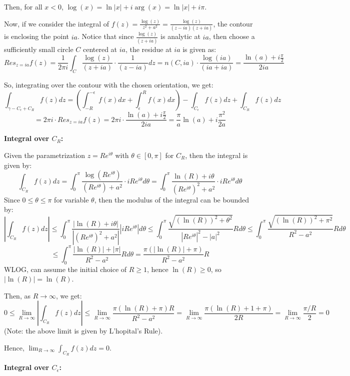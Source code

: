 \documentclass{article}
\begin{document}
Then, for all $x<0$, $\log(x)=\ln|x|+i\arg(x)=\ln|x|+i\pi$.

\hfil

Now, if we consider the integral of $f(z)=\frac{\log(z)}{z^2+a^2}=\frac{\log(z)}{(z-ia)(z+ia)}$, the contour is enclosing the point $ia$. 
Notice that since $\frac{\log(z)}{(z+ia)}$ is analytic at $ia$, then choose a sufficiently small circle $C$ centered at $ia$, the residue at $ia$ is given as:
$$Res_{z=ia}f(z) = \frac{1}{2\pi i}\int_{C}\frac{\log(z)}{(z+ia)}\cdot\frac{1}{(z-ia)}dz = n(C,ia)\cdot \frac{\log(ia)}{(ia+ia)} = \frac{\ln(a)+i\frac{\pi}{2}}{2ia}$$

So, integrating over the contour with the chosen orientation, we get:
$$\int_{\gamma - C_\epsilon + C_R}f(z)dz = \left(\int_{-R}^{-\epsilon}f(x)dx+\int_{\epsilon}^{R}f(x)dx\right) - \int_{C_\epsilon}f(z)dz + \int_{C_R}f(z)dz$$
$$ = 2\pi i\cdot Res_{z=ia}f(z) = 2\pi i\cdot \frac{\ln(a)+i\frac{\pi}{2}}{2ia} = \frac{\pi}{a}\ln(a)+i\frac{\pi^2}{2a}$$

\hfil

\textbf{Integral over $C_R$:}

Given the parametrization $z=Re^{i\theta}$ with $\theta\in [0,\pi]$ for $C_R$, then the integral is given by:
$$\int_{C_R}f(z)dz = \int_{0}^{\pi}\frac{\log(Re^{i\theta})}{(Re^{i\theta})+a^2}\cdot iRe^{i\theta}d\theta = \int_{0}^{\pi}\frac{\ln(R) + i\theta}{(Re^{i\theta})^2+a^2}\cdot iRe^{i\theta}d\theta$$
Since $0\leq \theta \leq \pi$ for variable $\theta$, then the modulus of the integral can be bounded by:
$$\left|\int_{C_R}f(z)dz\right|\leq \int_{0}^{\pi}\frac{|\ln(R) + i\theta|}{|(Re^{i\theta})^2+a^2|}|iRe^{i\theta}|d\theta \leq \int_{0}^{\pi}\frac{\sqrt{(\ln(R))^2+\theta^2}}{|Re^{i\theta}|^2-|a|^2}Rd\theta \leq \int_{0}^{\pi}\frac{\sqrt{(\ln(R))^2+\pi^2}}{R^2-a^2}Rd\theta$$
$$\leq \int_{0}^{\pi}\frac{|\ln(R)|+|\pi|}{R^2-a^2}Rd\theta = \frac{\pi(|\ln(R)|+\pi)}{R^2-a^2}R$$
WLOG, can assume the initial choice of $R\geq 1$, hence $\ln(R)\geq 0$, so $|\ln(R)|=\ln(R)$.

Then, as $R\rightarrow\infty$, we get:
$$0\leq \lim_{R\rightarrow\infty}\left|\int_{C_R}f(z)dz\right| \leq \lim_{R\rightarrow\infty}\frac{\pi(\ln(R)+\pi)R}{R^2-a^2} = \lim_{R\rightarrow\infty}\frac{\pi(\ln(R)+1+\pi)}{2R} = \lim_{R\rightarrow\infty}\frac{\pi/R}{2} = 0$$
(Note: the above limit is given by L'hopital's Rule).

Hence, $\lim_{R\rightarrow\infty}\int_{C_R}f(z)dz = 0$.

\hfil

\textbf{Integral over $C_\epsilon$:}
\end{document}
